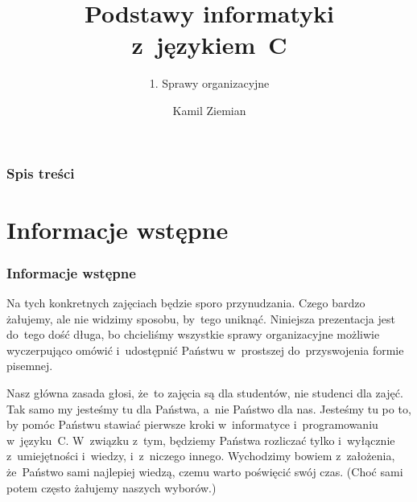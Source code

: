 \documentclass[10pt,t]{beamer}
\title{Podstawy informatyki z~językiem~C}
\subtitle{1. Sprawy organizacyjne}
\author{Kamil Ziemian \\
  \email}
\begin{document}





\RaggedRight





\maketitle





\begin{frame}
  \frametitle{Spis treści}


  \tableofcontents

\end{frame}





\section{Informacje wstępne}



\begin{frame}
  \frametitle{Informacje wstępne}


  Na tych konkretnych zajęciach będzie sporo przynudzania. Czego bardzo
  żałujemy, ale nie widzimy sposobu, by~tego uniknąć. Niniejsza prezentacja
  jest do~tego dość długa, bo chcieliśmy wszystkie sprawy organizacyjne
  możliwie wyczerpująco omówić i~udostępnić Państwu w~prostszej
  do~przyswojenia formie pisemnej.

  Nasz główna zasada głosi, że~to zajęcia są dla studentów, nie studenci
  dla zajęć. Tak samo my jesteśmy tu dla Państwa, a~nie Państwo dla nas.
  Jesteśmy tu po to, by pomóc Państwu stawiać pierwsze kroki w~informatyce
  i~programowaniu w~języku~C. W~związku z~tym, będziemy Państwa
  rozliczać tylko i~wyłącznie z~umiejętności i~wiedzy, i~z~niczego innego.
  Wychodzimy bowiem z~założenia, że~Państwo sami najlepiej wiedzą, czemu
  warto poświęcić swój czas. (Choć sami potem często żałujemy naszych
  wyborów.)

\end{frame}
\end{document}
